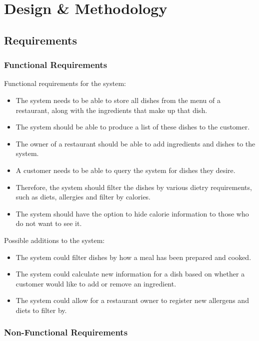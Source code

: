 \chapter{Design \& Methodology}

\section{Requirements}

\subsection{Functional Requirements}

Functional requirements for the system:

\begin{itemize}
\item The system needs to be able to store all dishes from the menu of a restaurant, along with the ingredients that make up that dish.
\item The system should be able to produce a list of these dishes to the customer.
\item The owner of a restaurant should be able to add ingredients and dishes to the system.
\item A customer needs to be able to query the system for dishes they desire.
\item Therefore, the system should filter the dishes by various dietry requirements, such as diets, allergies and filter by calories.
\item The system should have the option to hide calorie information to those who do not want to see it.
\end{itemize}

Possible additions to the system:

\begin{itemize}
\item The system could filter dishes by how a meal has been prepared and cooked.
\item The system could calculate new information for a dish based on whether a customer would like to add or remove an ingredient.
\item The system could allow for a restaurant owner to register new allergens and diets to filter by.
\end{itemize}

\subsection{Non-Functional Requirements}

